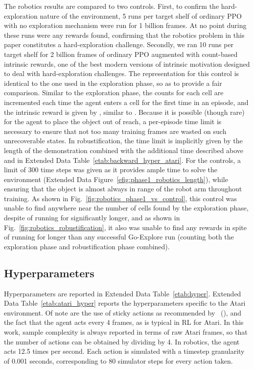 \documentclass{nature}
\renewcommand*{\cite}[1]{\supercite{#1}}
\newcommand{\citefull}[1]{\citeauthor{#1}~(\citeyear{#1})\cite{#1}}
\begin{document}
\begin{methods}
The robotics results are compared to two controls. First, to confirm the hard-exploration nature of the environment, 5 runs per target shelf of ordinary PPO\cite{Schulman2017ProximalPO} with no exploration mechanism were run for 1 billion frames. At no point during these runs were any rewards found, confirming that the robotics problem in this paper constitutes a hard-exploration challenge. Secondly, we ran 10 runs per target shelf for 2 billion frames of ordinary PPO augmented with count-based intrinsic rewards, one of the best modern versions of intrinsic motivation\cite{strehl2008analysis,tang2017exploration,bellemare2016unifying,Taiga2020On} designed to deal with hard-exploration challenges. The representation for this control is identical to the one used in the exploration phase, so as to provide a fair comparison. Similar to the exploration phase, the counts for each cell are incremented each time the agent enters a cell for the first time in an episode, and the intrinsic reward is given by , similar to . Because it is possible (though rare) for the agent to place the object out of reach, a per-episode time limit is necessary to ensure that not too many training frames are wasted on such unrecoverable states. In robustification, the time limit is implicitly given by the length of the demonstration combined with the additional time described above and in Extended Data Table~\ref{etab:backward_hyper_atari}. For the controls, a limit of 300 time steps was given as it provides ample time to solve the environment (Extended Data Figure~\ref{efig:phase1_robotics_length}), while ensuring that the object is almost always in range of the robot arm throughout training. As shown in Fig.~\ref{fig:robotics_phase1_vs_control}, this control was unable to find anywhere near the number of cells found by the exploration phase, despite of running for significantly longer, and as shown in Fig.~\ref{fig:robotics_robustification}, it also was unable to find any rewards in spite of running for longer than any successful Go-Explore run (counting both the exploration phase and robustification phase combined).


\subsection{Hyperparameters}
\label{sec:hyperparameters}

Hyperparameters are reported in Extended Data Table~\ref{etab:hyper}. Extended Data Table~\ref{etab:atari_hyper} reports the hyperparameters specific to the Atari environment. Of note are the use of sticky actions as recommended by \citefull{Machado2018RevisitingTA}, and the fact that the agent acts every 4 frames, as is typical in RL for Atari\cite{mnih:nature15}. In this work, sample complexity is always reported in terms of raw Atari frames, so that the number of actions can be obtained by dividing by 4. In robotics, the agent acts 12.5 times per second. Each action is simulated with a timestep granularity of 0.001 seconds, corresponding to 80 simulator steps for every action taken. 


\end{methods}
\end{document}
